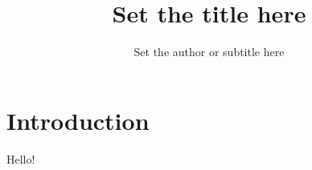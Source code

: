 \documentclass[journal]{new-aiaa} %
\title{Set the title here}
\author{Set the author or subtitle here}
\begin{document}
\maketitle

\section*{Introduction}

Hello!


\end{document}
